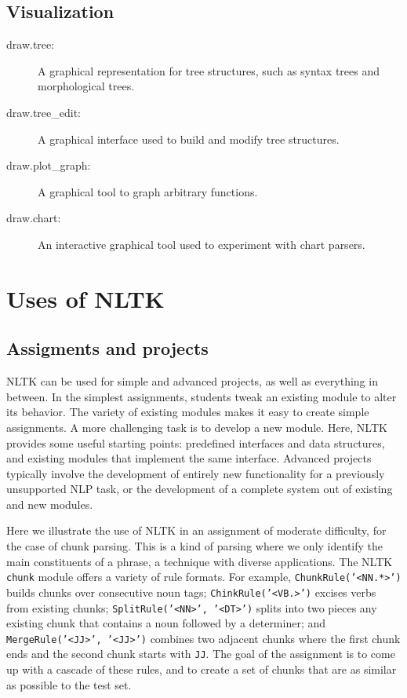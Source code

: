 \documentclass[11pt]{article}
\begin{document}
\subsection*{Visualization}

\begin{description}
\item[draw.tree:] A graphical representation for tree
      structures, such as syntax trees and morphological trees. 
\item[draw.tree\_edit:] A graphical interface used to
      build and modify tree structures.
\item[draw.plot\_graph:] A graphical tool to graph
      arbitrary functions.
\item[draw.chart:] An interactive graphical tool used to
      experiment with chart parsers.
\end{description}

\section{Uses of NLTK}

\subsection{Assigments and projects}

NLTK can be used for simple and advanced projects, as well as
everything in between.  In the simplest assignments, students
tweak an existing module to alter its behavior.  The variety of
existing modules makes it easy to create simple assignments.
A more challenging task is to develop a new module.  Here, NLTK provides
some useful starting points: predefined interfaces and data structures, and
existing modules that implement the same interface.  Advanced projects
typically involve the development of entirely new functionality for a
previously unsupported NLP task, or the development of a complete system
out of existing and new modules.

Here we illustrate the use of NLTK in an assignment of moderate
difficulty, for the case of chunk parsing.  This is a kind of parsing
where we only identify the main constituents of a phrase, a technique
with diverse applications.  The NLTK \texttt{chunk} module offers
a variety of rule formats.  For example,
\texttt{ChunkRule('<NN.*>')} builds chunks over consecutive noun tags;
\texttt{ChinkRule('<VB.>')} excises verbs from existing chunks;
\texttt{SplitRule('<NN>', '<DT>')} splits into two pieces any existing
chunk that contains a noun followed by a determiner; and
\texttt{MergeRule('<JJ>', '<JJ>')} combines two adjacent chunks
where the first chunk ends and the second chunk starts with \texttt{JJ}.
The goal of the assignment is to come up with a cascade of these rules,
and to create a set of chunks that are as similar as possible to the test set.
\end{document}
